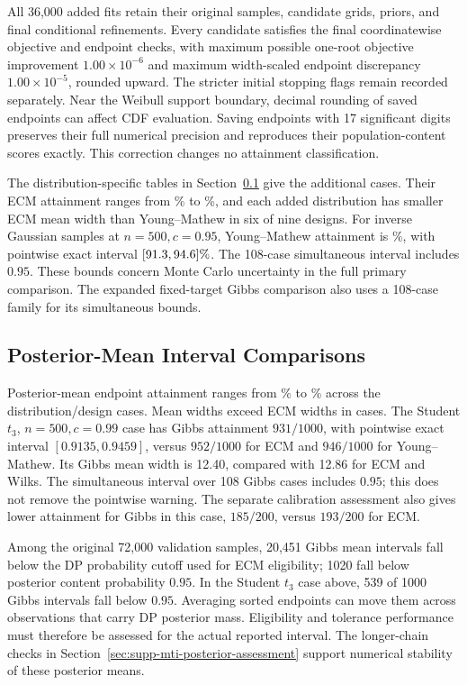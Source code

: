 \documentclass[11pt]{article}
\begin{document}
All 36,000 added fits retain their original samples, candidate grids, priors,
and final conditional refinements. Every candidate satisfies the final
coordinatewise objective and endpoint checks, with maximum possible
one-root objective improvement \(1.00\times10^{-6}\) and maximum
width-scaled endpoint discrepancy \(1.00\times10^{-5}\), rounded upward.
The stricter initial stopping flags remain recorded separately. Near the
Weibull support boundary, decimal rounding of saved endpoints can affect
CDF evaluation. Saving endpoints with 17 significant digits preserves their
full numerical precision and reproduces their population-content scores
exactly. This correction changes no attainment classification.

The distribution-specific tables in
Section~\ref{sec:supp-mti-full-validation} give the additional cases.
Their ECM attainment ranges from \MTIExpandedNewMin\% to
\MTIExpandedNewMax\%, and each added distribution has smaller ECM mean
width than Young--Mathew in six of nine designs. For inverse Gaussian
samples at \(n=500,c=0.95\), Young--Mathew attainment is
\MTIExpandedYMWarning\%, with pointwise exact interval
\([91.3,94.6]\%\).
The 108-case simultaneous interval includes \(0.95\). These bounds concern
Monte Carlo uncertainty in the full primary comparison. The expanded
fixed-target Gibbs comparison also uses a 108-case family for its
simultaneous bounds.

\subsection{Posterior-Mean Interval Comparisons}
\label{sec:supp-mti-full-validation}

Posterior-mean endpoint attainment ranges from \MTIGibbsExpandedMin\%
to \MTIGibbsExpandedMax\% across the \MTIGibbsExpandedCases{}
distribution/design cases.
Mean widths exceed ECM widths in \MTIGibbsExpandedWider{} cases. The Student
\(t_3\), \(n=500,c=0.99\) case has Gibbs attainment \(931/1000\), with
pointwise exact interval \([0.9135,0.9459]\), versus \(952/1000\) for
ECM and \(946/1000\) for Young--Mathew. Its Gibbs mean width is 12.40,
compared with 12.86 for ECM and Wilks. The simultaneous interval over 108
Gibbs cases includes \(0.95\); this does not remove the pointwise warning.
The separate calibration assessment also gives lower attainment for Gibbs
in this case, \(185/200\), versus \(193/200\) for ECM.

Among the original 72,000 validation samples, 20,451 Gibbs mean intervals fall below the DP
probability cutoff used for ECM eligibility; 1020 fall below posterior
content probability \(0.95\). In the Student \(t_3\) case above, 539 of
1000 Gibbs intervals fall below \(0.95\). Averaging sorted endpoints can
move them across observations that carry DP posterior mass. Eligibility
and tolerance performance must therefore be assessed for the actual
reported interval. The longer-chain checks in
Section~\ref{sec:supp-mti-posterior-assessment} support numerical stability
of these posterior means.
\end{document}
